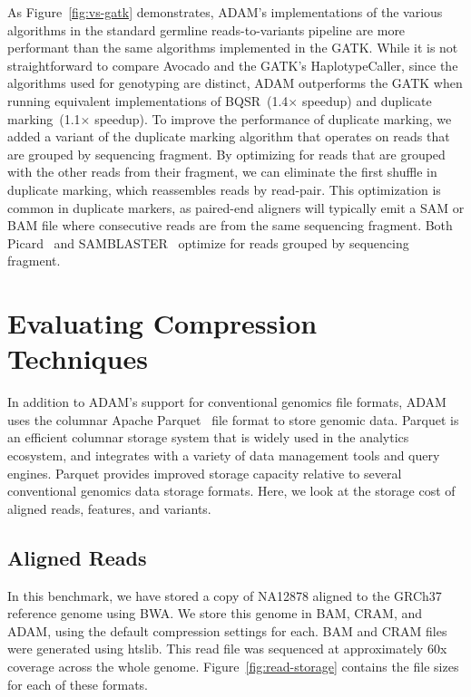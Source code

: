\documentclass[phd]{ucbthesis}
\begin{document}
As Figure~\ref{fig:vs-gatk} demonstrates, ADAM's implementations of the various
algorithms in the standard germline reads-to-variants pipeline are more
performant than the same algorithms implemented in the GATK. While it is not
straightforward to compare Avocado and the GATK's HaplotypeCaller, since the
algorithms used for genotyping are distinct, ADAM outperforms the GATK when
running equivalent implementations of BQSR~(1.4$\times$ speedup) and duplicate
marking~(1.1$\times$ speedup). To improve the performance of duplicate marking,
we added a variant of the duplicate marking algorithm that operates on reads
that are grouped by sequencing fragment. By optimizing for reads that are
grouped with the other reads from their fragment, we can eliminate the first
shuffle in duplicate marking, which reassembles reads by read-pair. This
optimization is common in duplicate markers, as paired-end aligners will
typically emit a SAM or BAM file where consecutive reads are from the same
sequencing fragment. Both Picard~\cite{picard} and SAMBLASTER~\cite{faust14}
optimize for reads grouped by sequencing fragment.

\section{Evaluating Compression Techniques}
\label{sec:compression}

In addition to ADAM's support for conventional genomics file formats, ADAM uses
the columnar Apache Parquet~\cite{parquet} file format to store genomic data.
Parquet is an efficient columnar storage system that is widely used in the
analytics ecosystem, and integrates with a variety of data management tools and
query engines. Parquet provides improved storage capacity relative to several
conventional genomics data storage formats. Here, we look at the storage cost of
aligned reads, features, and variants.

\subsection{Aligned Reads}
\label{sec:aligned-reads-storage}

In this benchmark, we have stored a copy of NA12878 aligned to the GRCh37
reference genome using BWA. We store this genome in BAM, CRAM, and ADAM, using
the default compression settings for each. BAM and CRAM files were generated
using htslib. This read file was sequenced at approximately 60x coverage across
the whole genome. Figure~\ref{fig:read-storage} contains the file sizes for each
of these formats.
\end{document}
